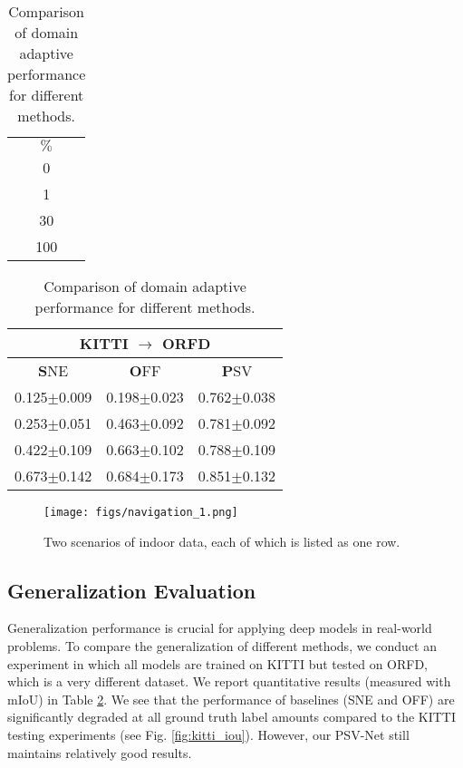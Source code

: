 \documentclass[letterpaper, 10 pt, journal, twoside]{ieeetran}
\begin{document}
\begin{table} \vspace{7pt}
\caption{\small Comparison of domain adaptive performance for different methods. }
\label{tab:adaptation}
\begin{tabular}{c}
\hline \hline
\\
\hline
$\%$\\
\hline 
0\\
1\\
30\\
100\\
\hline \hline
\end{tabular}
\begin{tabular}{ccc}
\hline \hline
\multicolumn{3}{c}{KITTI $\rightarrow$ ORFD}\\
\hline
\textbf{S}NE&\textbf{O}FF&\textbf{P}SV\\
\hline
0.125$\pm$0.009 & 0.198$\pm$0.023 & 0.762$\pm$0.038\\
0.253$\pm$0.051 & 0.463$\pm$0.092 & 0.781$\pm$0.092\\
0.422$\pm$0.109 & 0.663$\pm$0.102 & 0.788$\pm$0.109\\
0.673$\pm$0.142 & 0.684$\pm$0.173 & 0.851$\pm$0.132\\
\hline \hline
\end{tabular}
\end{table} 

\begin{figure}
{
\centering
  {\texttt{[image: figs/navigation\_1.png]}}
\caption{\small Two scenarios of indoor data, each of which is listed as one row.
} 
\label{fig:indoor_data}  
}
\end{figure}

\subsection{Generalization Evaluation}
Generalization performance is crucial for applying deep models in real-world problems. To compare the generalization  of different methods, we conduct an   experiment  in which  all models are  trained on KITTI but  tested  on ORFD, which is a very different dataset.
We report quantitative results (measured with mIoU) in Table \ref{tab:adaptation}. We see that the performance of baselines (SNE and OFF) are significantly degraded at all ground truth label amounts compared to the KITTI testing experiments (see Fig. \ref{fig:kitti_iou}). However, our PSV-Net  still maintains relatively good results.
\end{document}
